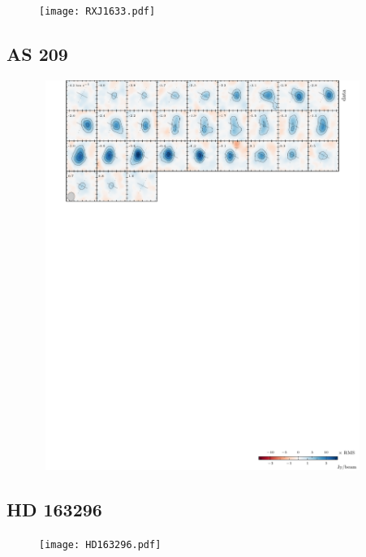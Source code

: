 \documentclass[twocolumn]{aastex6}
\begin{document}
\begin{figure}[htb]
\begin{center}
  \texttt{[image: RXJ1633.pdf]}
  \end{center}
\end{figure}

\subsection{AS 209}



\begin{figure}[htb]
\begin{center}
  \includegraphics[draft, width=0.95\textwidth, height=5in]{AS209.pdf}
  \end{center}
\end{figure}

\subsection{HD 163296}

\begin{figure}[htb]
\begin{center}
  \texttt{[image: HD163296.pdf]}
  \end{center}
\end{figure}
\end{document}
